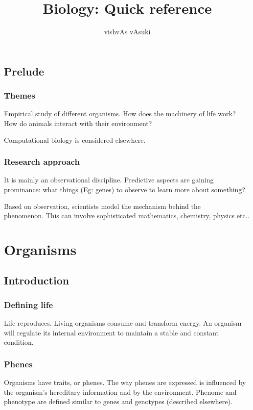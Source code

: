 \documentclass[oneside, article]{memoir}
\title{Biology: Quick reference}
\author{vishvAs vAsuki}
\begin{document}
\maketitle
\tableofcontents

\chapter{Prelude}
\section{Themes}
Empirical study of different organisms. How does the machinery of life work? How do animals interact with their environment?

Computational biology is considered elsewhere.

\section{Research approach}
It is mainly an observational discipline. Predictive aspects are gaining prominance: what things (Eg: genes) to observe to learn more about something?

Based on observation, scientists model the mechanism behind the\\ phenomenon. This can involve sophisticated mathematics, chemistry, physics etc..

\part{Organisms}
\chapter{Introduction}
\section{Defining life}
Life reproduces. Living organisms consume and transform energy. An organism will regulate its internal environment to maintain a stable and constant condition.

\section{Phenes}
Organisms have traits, or phenes. The way phenes are expressed is influenced by the organism's hereditary information and by the environment. Phenome and phenotype are defined similar to genes and genotypes (described elsewhere).
\end{document}
